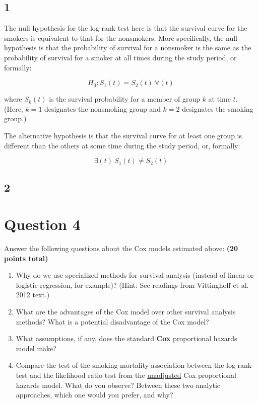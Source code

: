 \documentclass{article}\usepackage[]{graphicx}\usepackage[]{color}
\newif\ifdraft  %
\begin{document}
\fi

\subsection*{1}

The null hypothesis for the log-rank test here is that the survival curve for the smokers is equivalent to that for the nonsmokers.  More specifically, the null hypothesis is that the probability of survival for a nonsmoker is the same as the probability of survival for a smoker at all times during the study period, or formally:

$$ H_0: S_1(t) = S_2(t) \: \forall(t) $$

where $S_k(t)$ is the survival probability for a member of group $k$ at time $t$.  (Here, $k=1$ designates the nonsmoking group and $k=2$ designates the smoking group.)

\vspace{2mm}

The alternative hypothesis is that the survival curve for at least one group is different than the others at some time during the study period, or, formally:

$$ \exists (t) \: S_1(t) \neq S_2(t) $$

\subsection*{2}





\pagebreak

\section*{Question 4}

\ifdraft

Answer the following questions about the Cox models estimated above: \textbf{(20 points total)}
  \begin{enumerate}
    \item Why do we use specialized methods for survival analysis (instead of linear or logistic regression, for example)? (Hint: See readings from Vittinghoff et al. 2012 text.)
    \item What are the advantages of the Cox model over other survival analysis methods? What is a potential disadvantage of the Cox model?
    \item What assumptions, if any, does the standard \textbf{Cox} proportional hazards model make?
    \item Compare the test of the smoking-mortality association between the log-rank test and the likelihood ratio test from the \ul{unadjusted} Cox proportional hazards model. What do you observe? Between these two analytic approaches, which one would you prefer, and why?
  \end{enumerate}
\end{document}
